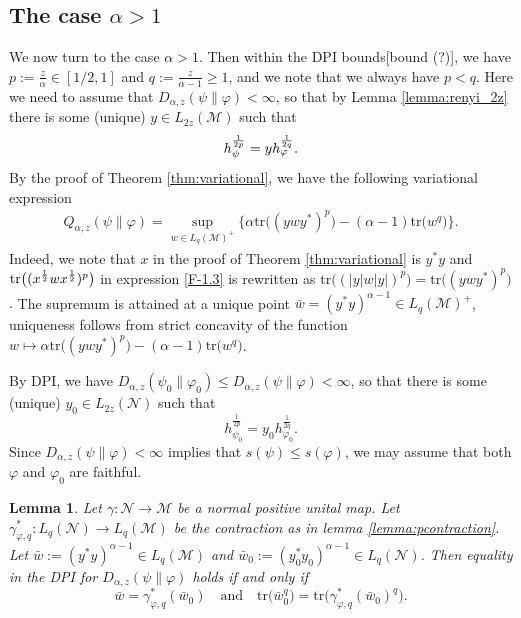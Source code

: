 \documentclass[12pt]{article}
\newtheorem{lemma}[theorem]{Lemma}
\theoremstyle{definition}
\theoremstyle{remark}
\numberwithin{equation}{section}
\def\Me{\mathcal M}
\def\Ne{\mathcal N}
\def\Tr{\mathrm{tr}}
\def\ffi{\varphi}
\begin{document}
\subsection{The case $\alpha>1$}

We now turn to the case $\alpha>1$. %
Then within the DPI bounds{\color{red}[bound (?)]}, we have $p:=\frac z\alpha\in [1/2,1]$ and
$q:=\frac z{\alpha-1}\ge 1$, and we note that we always have $p<q$. Here we need to assume that
$D_{\alpha,z}(\psi\|\ffi)<\infty$, so that by Lemma \ref{lemma:renyi_2z} there is some
(unique) $y\in L_{2z}(\Me)$ such that
\[
h_{\psi}^{1\over 2p}=y h_\ffi^{1\over 2q}.
\]
By the proof of Theorem \ref{thm:variational}, we have the following variational expression
\begin{align}\label{eq:variationalq}
Q_{\alpha,z}(\psi\|\varphi) =\sup_{w\in
L_q(\Me)^+}\bigl\{\alpha\Tr\bigl((ywy^*)^p\bigr)-(\alpha-1)\Tr\bigl(w^q\bigr)\bigr\}.
\end{align}
{\color{red}Indeed, we note that $x$ in the proof of Theorem \ref{thm:variational} is $y^*y$ and
$\Tr\bigl((x^{1\over2}wx^{1\over2})^p\bigr)$ in expression \eqref{F-1.3} is rewritten as
$\Tr\bigl((|y|w|y|)^p\bigr)=\Tr\bigl((ywy^*)^p\bigr)$.}
The supremum is attained at a unique point $\bar
w=(y^*y)^{\alpha-1}\in L_q(\Me)^+$, uniqueness follows from strict concavity of the
function $w\mapsto \alpha\Tr\bigl((ywy^*)^p\bigr)-(\alpha-1)\Tr\bigl( w^q\bigr)$.


By DPI, we have $D_{\alpha,z}(\psi_0\|\varphi_0)\le D_{\alpha,z}(\psi\|\varphi)<\infty$,
so that there is some (unique) $y_0\in L_{2z}(\Ne)$ such that 
\[
h_{\psi_0}^{\frac1{2p}}=y_0h_{\varphi_0}^{\frac1{2q}}.
\]
Since $D_{\alpha,z}(\psi\|\ffi)<\infty$ implies that $s(\psi)\le s(\ffi)$, we may assume that both $\ffi$ and
$\ffi_0$ are faithful.


\begin{lemma}\label{lemma:le} Let $\gamma:\Ne\to\Me$ be a normal positive unital map. 
Let $\gamma^*_{\ffi,q}:L_q(\Ne)\to L_q(\Me)$ be the contraction as in lemma \ref{lemma:pcontraction}. 
Let $\bar w:=(y^*y)^{\alpha-1}\in L_q(\Me)$ and $\bar w_0:=(y_0^*y_0)^{\alpha-1}\in
L_q(\Ne)$. Then equality in {\color{red}the DPI for $D_{\alpha,z}(\psi\|\ffi)$} holds if and only if
\begin{equation}\label{eq:dpiw}
\bar w=\gamma^*_{\ffi,q}(\bar w_0)\quad \text{and}\quad  
\Tr\bigl(\bar w_0^q\bigr)=\Tr\bigl(\gamma^*_{\varphi,q}(\bar w_0)^q\bigr).
\end{equation}
\end{lemma}
\end{document}
